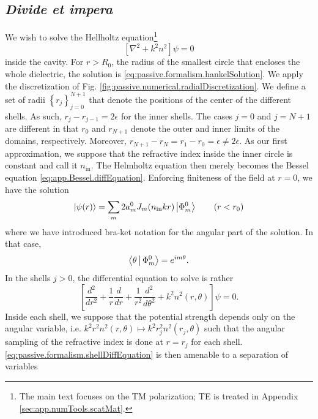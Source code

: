 \subsection{\textit{Divide et impera}}
We wish to solve the Hellholtz equation\footnote{The main text focuses on the
TM polarization; TE is treated in Appendix \ref{sec:app.numTools.scatMat}.}
  \begin{equation}
   \left[\nabla^2+k^2n^2\right]\psi = 0
  \end{equation}
inside the cavity. For $r>R_0$, the radius of the smallest circle
that encloses the whole dielectric, the solution is 
\eqref{eq:passive.formalism.hankelSolution}. We apply the discretization
of Fig. \ref{fig:passive.numerical.radialDiscretization}. We define a set of 
radii $\left\{r_j\right\}_{j=0}^{N+1}$ that denote the positions of the center
of the different shells. As such, $r_j-r_{j-1}=2\epsilon$ for the inner shells.
The cases $j=0$ and $j=N+1$ are different in that $r_0$ and $r_{N+1}$ denote 
the outer and inner limits of the domains, respectively. Moreover, $r_{N+1}-r_N=r_1-r_0=\epsilon\neq2\epsilon$.
As our first approximation, we suppose that the refractive index
inside the inner circle is constant and call it $n_\text{in}$. The Helmholtz equation then merely
becomes the Bessel equation \eqref{eq:app.Bessel.diffEquation}. Enforcing
finiteness of the field at $r=0$, we have the solution
  \begin{equation}
  	\label{eq:passive.formalism.innerCircleSoln}
   \Ket{\psi(r)} = \sum_{m}2a_m^0J_m(n_\text{in}kr)\Ket{\Phi_m^0}	\qquad (r<r_0)
  \end{equation}
where we have introduced bra-ket notation for the angular part of the 
solution. In that case, 
  \begin{equation}
   \Braket{\theta|\Phi_m^0} = e^{im\theta}.
  \end{equation}
In the shells $j>0$, the differential equation to solve is rather
  \begin{equation}
    \label{eq:passive.formalism.shellDiffEquation}
    \left[\frac{d^2}{dr^2}+\frac{1}{r}\frac{d}{dr}+\frac{1}{r^2}\frac{d^2}{d\theta^2}+k^2n^2(r,\theta)\right]\psi=0.
  \end{equation}
Inside each shell, we suppose that the potential strength depends only on the angular variable, i.e.
$k^2r^2n^2(r,\theta)\mapsto k^2r_j^2n^2(r_j,\theta)$ such that the angular sampling of the refractive
index is done at $r=r_j$ for each shell. \eqref{eq:passive.formalism.shellDiffEquation} 
is then amenable to a separation of variables
